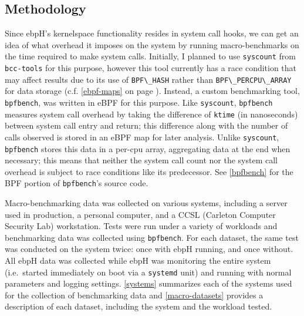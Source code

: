 \documentclass[
  12pt]{findlay}
\begin{document}
\hypertarget{methodology}{%
\subsection{Methodology}\label{methodology}}

\label{methodology-section}

Since ebpH's kernelspace functionality resides in system call hooks, we
can get an idea of what overhead it imposes on the system by running
macro-benchmarks on the time required to make system calls. Initially, I
planned to use \passthrough{\lstinline!syscount!} \autocite{syscount}
from \passthrough{\lstinline!bcc-tools!} for this purpose, however this
tool currently has a race condition that may affect results due to its
use of \passthrough{\lstinline!BPF\_HASH!} rather than
\passthrough{\lstinline!BPF\_PERCPU\_ARRAY!} for data storage (c.f.
\autoref{ebpf-maps} on page \pageref{ebpf-maps}). Instead, a custom
benchmarking tool, \passthrough{\lstinline!bpfbench!}\footnotemark{},
was written in eBPF for this purpose. Like
\passthrough{\lstinline!syscount!}, \passthrough{\lstinline!bpfbench!}
measures system call overhead by taking the difference of
\passthrough{\lstinline!ktime!} (in nanoseconds) between system call
entry and return; this difference along with the number of calls
observed is stored in an eBPF map for later analysis. Unlike
\passthrough{\lstinline!syscount!}, \passthrough{\lstinline!bpfbench!}
stores this data in a per-cpu array, aggregating data at the end when
necessary; this means that neither the system call count nor the system
call overhead is subject to race conditions like its predecessor. See
\autoref{bpfbench} for the BPF portion of
\passthrough{\lstinline!bpfbench!}'s source code.

Macro-benchmarking data was collected on various systems, including a
server used in production, a personal computer, and a CCSL (Carleton
Computer Security Lab) workstation. Tests were run under a variety of
workloads and benchmarking data was collected using
\passthrough{\lstinline!bpfbench!}. For each dataset, the same test was
conducted on the system twice: once with ebpH running, and once without.
All ebpH data was collected while ebpH was monitoring the entire system
(i.e.~started immediately on boot via a
\passthrough{\lstinline!systemd!} unit) and running with normal
parameters and logging settings. \autoref{systems} summarizes each of
the systems used for the collection of benchmarking data and
\autoref{macro-datasets} provides a description of each dataset,
including the system and the workload tested.
\end{document}
